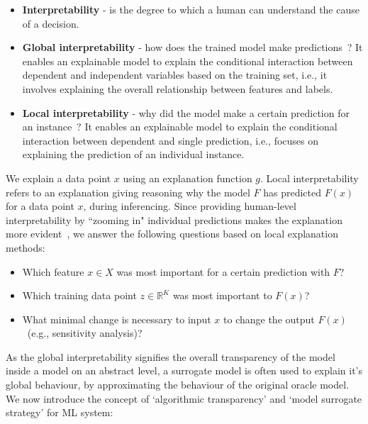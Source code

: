 \begin{itemize}[noitemsep]
    \item \textbf{Interpretability} - is the degree to which a human can understand the cause of a decision.
    \item \textbf{Global interpretability} - how does the trained model make predictions~\cite{molnar2019interpretable}? It enables an explainable model to explain the conditional interaction between dependent and independent variables based on the training set, i.e., it involves explaining the overall relationship between features and labels.
    \item \textbf{Local interpretability} - why did the model make a certain prediction for an instance~\cite{molnar2019interpretable}? It enables an explainable model to explain the conditional interaction between dependent and single prediction, i.e., focuses on explaining the prediction of an individual instance. 
\end{itemize}

\hspace*{3.5mm} We explain a data point $x$ using an explanation function $g$. Local interpretability refers to an explanation giving reasoning why the model $F$ has predicted $F(x)$ for a data point $x$, during inferencing. Since providing human-level interpretability by ``zooming in" individual predictions makes the explanation more evident~\cite{ribeiro2018anchors}, we answer the following questions based on local explanation methods: 

\begin{itemize}[noitemsep]
    \item Which feature $x \in X$ was most important for a certain prediction with $F$? 
    \item Which training data point $z \in \mathbb{R}^{K}$ was most important to $F(x)$? 
    \item What minimal change is necessary to input $x$ to change the output $F(x)$~(e.g., sensitivity analysis)? 
\end{itemize}

\hspace*{3.5mm} As the global interpretability signifies the overall transparency of the model inside a model on an abstract level, a surrogate model is often used to explain it's global behaviour, by approximating the behaviour of the original oracle model. We now introduce the concept of `algorithmic transparency' and `model surrogate strategy' for ML system: 

